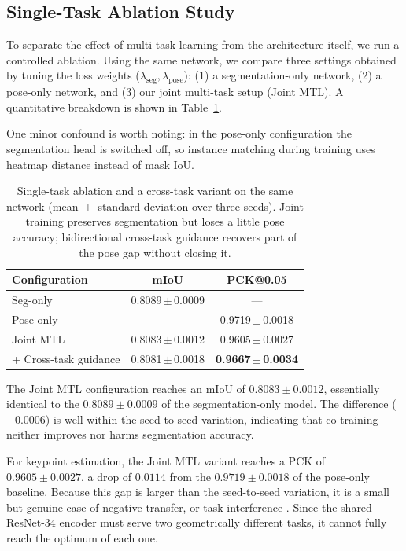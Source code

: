 \documentclass[runningheads]{llncs}
\begin{document}
\subsection{Single-Task Ablation Study}
\label{sec:ablation}
To separate the effect of multi-task learning from the architecture
itself, we run a controlled ablation. Using the same network, we
compare three settings obtained by tuning the loss weights
($\lambda_{\text{seg}}, \lambda_{\text{pose}}$):
(1) a segmentation-only network, (2) a pose-only network, and (3) our
joint multi-task setup (Joint MTL). A quantitative breakdown is shown
in Table~\ref{tab:ablation}.

One minor confound is worth noting: in the pose-only configuration the
segmentation head is switched off, so instance matching during
training uses heatmap distance instead of mask IoU.

\begin{table}[t]
\caption{Single-task ablation and a cross-task variant on the same
network (mean~$\pm$~standard deviation over three seeds). Joint training
preserves segmentation but loses a little pose accuracy; bidirectional
cross-task guidance recovers part of the pose gap without closing it.}
\label{tab:ablation}
\centering
\begin{tabular}{lcc}
\toprule
\textbf{Configuration} & \textbf{mIoU} & \textbf{PCK@0.05} \\
\midrule
Seg-only   & 0.8089\,$\pm$\,0.0009 & —      \\
Pose-only  & —      & 0.9719\,$\pm$\,0.0018 \\
Joint MTL  & 0.8083\,$\pm$\,0.0012 & 0.9605\,$\pm$\,0.0027 \\
\quad + Cross-task guidance & 0.8081\,$\pm$\,0.0018 & \textbf{0.9667\,$\pm$\,0.0034} \\
\bottomrule
\end{tabular}
\end{table}

The Joint MTL configuration reaches an mIoU of $0.8083 \pm 0.0012$,
essentially identical to the $0.8089 \pm 0.0009$ of the
segmentation-only model. The difference ($-0.0006$) is well within the
seed-to-seed variation, indicating that co-training neither improves
nor harms segmentation accuracy.

For keypoint estimation, the Joint MTL variant reaches a PCK of
$0.9605 \pm 0.0027$, a drop of $0.0114$ from the $0.9719 \pm 0.0018$ of
the pose-only baseline. Because this gap is larger than the
seed-to-seed variation, it is a small but genuine case of negative
transfer, or task interference
\cite{kendall2018multitask,standley2020tasks}. Since
the shared ResNet-34 encoder must serve two geometrically different
tasks, it cannot fully reach the optimum of each one.
\end{document}
